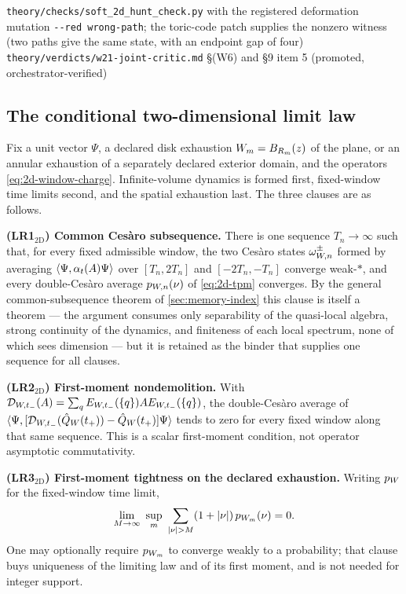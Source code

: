 %
{\texttt{theory/checks/soft\_2d\_hunt\_check.py} with the registered
deformation mutation \texttt{-{}-red wrong-path}; the toric-code patch supplies
the nonzero witness (two paths give the same state, with an endpoint gap of
four)}%
{\texttt{theory/verdicts/w21-joint-critic.md} \S(W6) and \S9 item 5
(promoted, orchestrator-verified)}

\subsection{The conditional two-dimensional limit law}

\begin{definition}\label{def:2d-relaxation}
Fix a unit vector $\Psi$, a declared disk exhaustion $W_m=B_{R_m}(z)$ of
the plane, or an annular exhaustion of a separately declared exterior domain,
and the operators \eqref{eq:2d-window-charge}. Infinite-volume dynamics is
formed first, fixed-window time limits second, and the spatial exhaustion
last. The three clauses are as follows.

\smallskip
\noindent\textbf{(LR1$_{\mathrm{2D}}$) Common Ces\`aro subsequence.} There is
one sequence $T_n\to\infty$ such that, for every fixed admissible window, the
two Ces\`aro states
$\omega^{\pm}_{W,n}$ formed by averaging
$\langle \Psi,\alpha_t(A)\Psi\rangle$ over $[T_n,2T_n]$ and $[-2T_n,-T_n]$ converge
weak-$*$, and every double-Ces\`aro average $p_{W,n}(\nu)$ of
\eqref{eq:2d-tpm} converges. By the general common-subsequence theorem of
\cref{sec:memory-index} this clause is itself a theorem --- the argument
consumes only separability of the quasi-local algebra, strong continuity of the
dynamics, and finiteness of each local spectrum, none of which sees dimension
--- but it is retained as the binder that supplies one sequence for all
clauses.

\noindent\textbf{(LR2$_{\mathrm{2D}}$) First-moment nondemolition.} With
$\mathcal{D}_{W,t_-}(A)=\sum_qE_{W,t_-}(\{q\})AE_{W,t_-}(\{q\})$,
the double-Ces\`aro average of
$\langle \Psi,[\mathcal{D}_{W,t_-}(\hat{Q}_W(t_+))
-\hat{Q}_W(t_+)]\Psi\rangle$ tends to zero for every fixed window along that same
sequence. This is a scalar first-moment condition, not operator asymptotic
commutativity.

\noindent\textbf{(LR3$_{\mathrm{2D}}$) First-moment tightness on the declared
exhaustion.} Writing $p_W$ for the fixed-window time limit,
\begin{equation}
  \lim_{M\to\infty}\ \sup_m\ \sum_{\abs{\nu}>M}(1+\abs{\nu})\,
  p_{\tpWin_m}(\nu)=0 .
  \label{eq:2d-lr3}
\end{equation}
One may optionally require $p_{W_m}$ to converge weakly to a probability;
that clause buys uniqueness of the limiting law and of its first moment, and is
not needed for integer support.


\end{definition}
